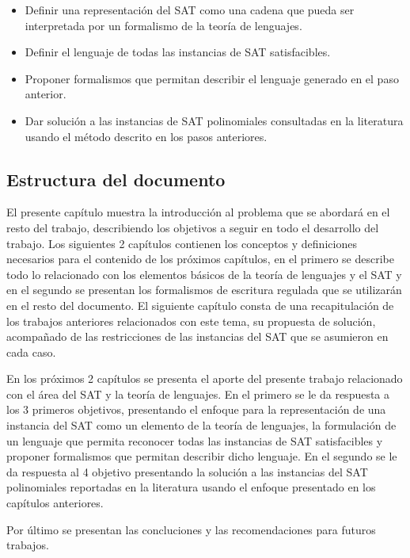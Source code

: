 \documentclass[12pt]{article}
\begin{document}
\begin{itemize}
      \item Definir una representación del SAT como una cadena que pueda ser interpretada por un formalismo de la teoría de lenguajes.
      \item Definir el lenguaje de todas las instancias de SAT satisfacibles.
      \item Proponer formalismos que permitan describir el lenguaje generado en el paso anterior.
      \item Dar solución a las instancias de SAT polinomiales consultadas en la literatura usando el método descrito en
            los pasos anteriores.
\end{itemize}

\subsection{Estructura del documento}

El presente capítulo muestra la introducción al problema que se abordará en el resto del trabajo, describiendo los
objetivos a seguir en todo el desarrollo del trabajo. Los siguientes 2 capítulos contienen los conceptos y definiciones
necesarios para el contenido de los próximos capítulos, en el primero se describe todo lo relacionado con los elementos básicos
de la teoría de lenguajes y el SAT y en el segundo se presentan los formalismos de escritura regulada que se utilizarán en el resto
del documento. El siguiente capítulo consta de una recapitulación de los trabajos anteriores relacionados con este tema, su propuesta
de solución, acompañado de las restricciones de las instancias del SAT que se asumieron en cada caso. 

En los próximos 2 capítulos se presenta el aporte del presente trabajo relacionado con el área del SAT y la teoría de lenguajes. 
En el primero se le da respuesta a los 3 primeros objetivos, presentando el enfoque para la representación de una instancia 
del SAT como un elemento de la teoría de lenguajes, la formulación de un lenguaje que permita reconocer todas las instancias
de SAT satisfacibles y proponer formalismos que permitan describir dicho lenguaje.
En el segundo se le da respuesta al 4 objetivo presentando la solución a las instancias del SAT polinomiales reportadas en la literatura
usando el enfoque presentado en los capítulos anteriores.

Por último se presentan las concluciones y las recomendaciones para futuros trabajos.
\end{document}
